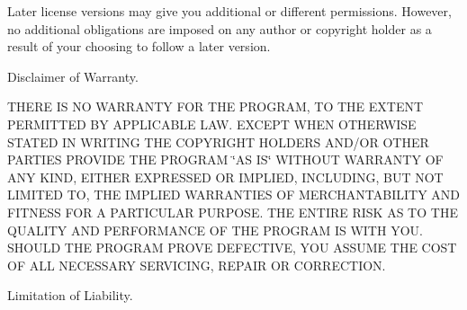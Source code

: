 Later license versions may give you additional or different permissions. However, no additional obligations are imposed on any author or copyright holder as a result of your choosing to follow a later version.


\begin{DoxyEnumerate}
\item Disclaimer of Warranty.
\end{DoxyEnumerate}

T\-H\-E\-R\-E I\-S N\-O W\-A\-R\-R\-A\-N\-T\-Y F\-O\-R T\-H\-E P\-R\-O\-G\-R\-A\-M, T\-O T\-H\-E E\-X\-T\-E\-N\-T P\-E\-R\-M\-I\-T\-T\-E\-D B\-Y A\-P\-P\-L\-I\-C\-A\-B\-L\-E L\-A\-W. E\-X\-C\-E\-P\-T W\-H\-E\-N O\-T\-H\-E\-R\-W\-I\-S\-E S\-T\-A\-T\-E\-D I\-N W\-R\-I\-T\-I\-N\-G T\-H\-E C\-O\-P\-Y\-R\-I\-G\-H\-T H\-O\-L\-D\-E\-R\-S A\-N\-D/\-O\-R O\-T\-H\-E\-R P\-A\-R\-T\-I\-E\-S P\-R\-O\-V\-I\-D\-E T\-H\-E P\-R\-O\-G\-R\-A\-M \char`\"{}\-A\-S I\-S\char`\"{} W\-I\-T\-H\-O\-U\-T W\-A\-R\-R\-A\-N\-T\-Y O\-F A\-N\-Y K\-I\-N\-D, E\-I\-T\-H\-E\-R E\-X\-P\-R\-E\-S\-S\-E\-D O\-R I\-M\-P\-L\-I\-E\-D, I\-N\-C\-L\-U\-D\-I\-N\-G, B\-U\-T N\-O\-T L\-I\-M\-I\-T\-E\-D T\-O, T\-H\-E I\-M\-P\-L\-I\-E\-D W\-A\-R\-R\-A\-N\-T\-I\-E\-S O\-F M\-E\-R\-C\-H\-A\-N\-T\-A\-B\-I\-L\-I\-T\-Y A\-N\-D F\-I\-T\-N\-E\-S\-S F\-O\-R A P\-A\-R\-T\-I\-C\-U\-L\-A\-R P\-U\-R\-P\-O\-S\-E. T\-H\-E E\-N\-T\-I\-R\-E R\-I\-S\-K A\-S T\-O T\-H\-E Q\-U\-A\-L\-I\-T\-Y A\-N\-D P\-E\-R\-F\-O\-R\-M\-A\-N\-C\-E O\-F T\-H\-E P\-R\-O\-G\-R\-A\-M I\-S W\-I\-T\-H Y\-O\-U. S\-H\-O\-U\-L\-D T\-H\-E P\-R\-O\-G\-R\-A\-M P\-R\-O\-V\-E D\-E\-F\-E\-C\-T\-I\-V\-E, Y\-O\-U A\-S\-S\-U\-M\-E T\-H\-E C\-O\-S\-T O\-F A\-L\-L N\-E\-C\-E\-S\-S\-A\-R\-Y S\-E\-R\-V\-I\-C\-I\-N\-G, R\-E\-P\-A\-I\-R O\-R C\-O\-R\-R\-E\-C\-T\-I\-O\-N.


\begin{DoxyEnumerate}
\item Limitation of Liability.
\end{DoxyEnumerate}

